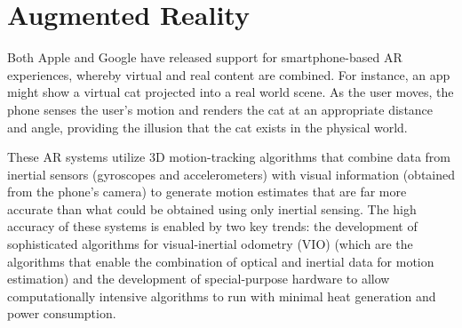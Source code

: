 \documentclass[chi_draft]{sigchi}
\newcommand{\BVI}{B/VI\xspace}
\newcommand{\OM}{O\&M\xspace}
\begin{document}

\section{Augmented Reality}
%

Both Apple and Google have released support for smartphone-based AR experiences, whereby virtual and real content are combined.  For instance, an app might show a virtual cat projected into a real world scene.  As the user moves, the phone senses the user's motion and renders the cat at an appropriate distance and angle, providing the illusion that the cat exists in the physical world.

These AR systems utilize 3D motion-tracking algorithms that combine data from inertial sensors (gyroscopes and accelerometers) with visual information (obtained from the phone's camera) to generate motion estimates that are far more accurate than what could be obtained using only inertial sensing.  The high accuracy of these systems is enabled by two key trends: the development of sophisticated algorithms for visual-inertial odometry (VIO) \cite{li2013high,leutenegger2015keyframe,bloesch2015robust,forster2014svo} (which are the algorithms that enable the combination of optical and inertial data for motion estimation) and the development of special-purpose hardware to allow computationally intensive algorithms to run with minimal heat generation and power consumption.%
\end{document}
